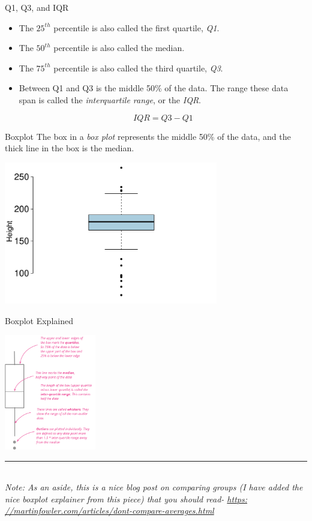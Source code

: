 \documentclass[notes,11pt, aspectratio=169]{beamer}
\newcommand{\Note}[1]{
\rule{2.5cm}{0.25pt} \\ \textit{\footnotesize{\textcolor{rubineRed}{Note:} \textcolor{darkerGray}{#1}}}}
\newcommand{\formula}[1]{
\begin{beamerboxesrounded}[shadow = false, lower = formula body]{}
#1
\end{beamerboxesrounded}
}
\newcommand{\hl}[1]{\textit{\textcolor{hlblue}{#1}}}
\begin{document}
\begin{frame}[fragile]{Q1, Q3, and IQR}

\begin{itemize}

\item The $25^{th}$ percentile is also called the first quartile, \hl{Q1}.

\item The $50^{th}$ percentile is also called the median.

\item The $75^{th}$ percentile is also called the third quartile, \hl{Q3}.

\item Between Q1 and Q3 is the middle 50\% of the data. The range these data span is called the \hl{interquartile range}, or the \hl{IQR}.
\formula{\[ IQR = Q3 - Q1 \]}
\end{itemize}

\end{frame}

\begin{frame}{Boxplot}
The box in a \hl{box plot} represents the middle 50\% of the data, and the thick line in the box is the median.

\begin{center}
\includegraphics[width=0.7\textwidth]{graphs/l02f10.pdf}
\end{center}

\end{frame}


\begin{frame}{Boxplot Explained}

\begin{center}
\includegraphics[width=0.3\textwidth]{graphs/boxplotExplainer.png}
\end{center}


 \Note{As an aside, this is a nice blog post on comparing groups (I have added the nice boxplot explainer from this piece) that you should read- \url{https:
//martinfowler.com/articles/dont-compare-averages.html}}
\end{frame}
\end{document}

